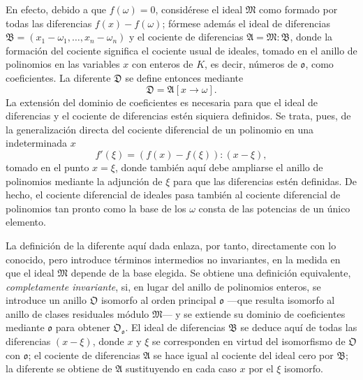 En efecto, debido a que $f(\omega)=0$, considérese el ideal $\mathfrak M$ como formado por todas las diferencias $f(x)-f(\omega)$; fórmese además el ideal de diferencias $\mathfrak B=(x_1-\omega_1,\ldots,x_n-\omega_n)$ y el cociente de diferencias $\mathfrak A=\mathfrak M:\mathfrak B$, donde la formación del cociente significa el cociente usual de ideales, tomado en el anillo de polinomios en las variables $x$ con enteros de $K$, es decir, números de $\mathfrak o$, como coeficientes. La diferente $\mathfrak D$ se define entonces mediante
\[
\mathfrak D=\mathfrak A[x\to\omega].
\]
La extensión del dominio de coeficientes es necesaria para que el ideal de diferencias y el cociente de diferencias estén siquiera definidos. Se trata, pues, de la generalización directa del cociente diferencial de un polinomio en una indeterminada $x$
\[
f'(\xi)=(f(x)-f(\xi)):(x-\xi),
\]
tomado en el punto $x=\xi$, donde también aquí debe ampliarse el anillo de polinomios mediante la adjunción de $\xi$ para que las diferencias estén definidas. De hecho, el cociente diferencial de ideales pasa también al cociente diferencial de polinomios tan pronto como la base de los $\omega$ consta de las potencias de un único elemento.

La definición de la diferente aquí dada enlaza, por tanto, directamente con lo conocido, pero introduce términos intermedios no invariantes, en la medida en que el ideal $\mathfrak M$ depende de la base elegida. Se obtiene una definición equivalente, \emph{completamente invariante}, si, en lugar del anillo de polinomios enteros, se introduce un anillo $\mathfrak O$ isomorfo al orden principal $\mathfrak o$ ---que resulta isomorfo al anillo de clases residuales módulo $\mathfrak M$--- y se extiende su dominio de coeficientes mediante $\mathfrak o$ para obtener $\mathfrak O_{\mathfrak o}$. El ideal de diferencias $\mathfrak B$ se deduce aquí de todas las diferencias $(x-\xi)$, donde $x$ y $\xi$ se corresponden en virtud del isomorfismo de $\mathfrak O$ con $\mathfrak o$; el cociente de diferencias $\mathfrak A$ se hace igual al cociente del ideal cero por $\mathfrak B$; la diferente se obtiene de $\mathfrak A$ sustituyendo en cada caso $x$ por el $\xi$ isomorfo.

